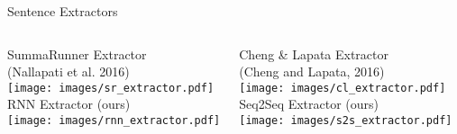 \begin{frame}{Sentence Extractors}
 \begin{columns}[t]
   \centering
   SummaRunner Extractor\\
   (Nallapati et al. 2016)\\
   \texttt{[image: images/sr\_extractor.pdf]}\\
   RNN Extractor (ours)\\
   \texttt{[image: images/rnn\_extractor.pdf]}

   \centering
   Cheng \& Lapata Extractor\\
   (Cheng and Lapata, 2016)\\
   \texttt{[image: images/cl\_extractor.pdf]}\\
   Seq2Seq Extractor (ours)\\
   \texttt{[image: images/s2s\_extractor.pdf]}
 \end{columns}

\end{frame}


%

